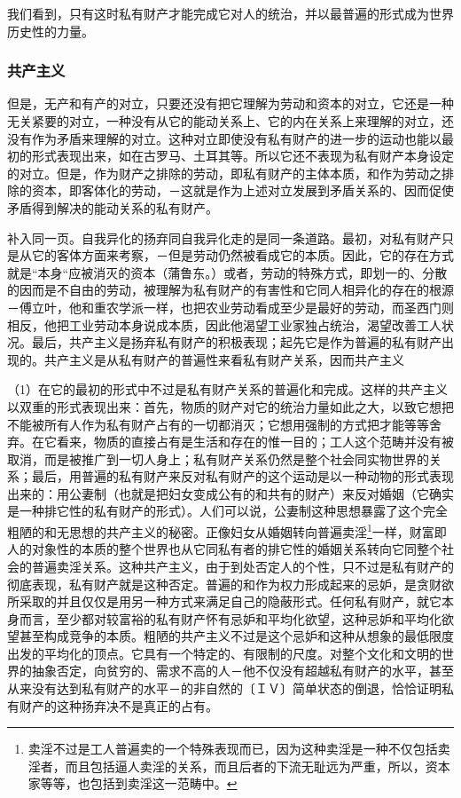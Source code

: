 \documentclass[a4paper,twoside,12pt]{ctexart}
\begin{document}
我们看到，只有这时私有财产才能完成它对人的统治，并以最普遍的形式成为世界历史性的力量。

\subsubsection{共产主义}
但是，无产和有产的对立，只要还没有把它理解为劳动和资本的对立，它还是一种无关紧要的对立，一种没有从它的能动关系上、它的内在关系上来理解的对立，还没有作为矛盾来理解的对立。这种对立即使没有私有财产的进一步的运动也能以最初的形式表现出来，如在古罗马、土耳其等。所以它还不表现为私有财产本身设定的对立。但是，作为财产之排除的劳动，即私有财产的主体本质，和作为劳动之排除的资本，即客体化的劳动，－这就是作为上述对立发展到矛盾关系的、因而促使矛盾得到解决的能动关系的私有财产。

补入同一页。自我异化的扬弃同自我异化走的是同一条道路。最初，对私有财产只是从它的客体方面来考察，－但是劳动仍然被看成它的本质。因此，它的存在方式就是“本身“应被消灭的资本（蒲鲁东。）或者，劳动的特殊方式，即划一的、分散的因而是不自由的劳动，被理解为私有财产的有害性和它同人相异化的存在的根源－傅立叶，他和重农学派一样，也把农业劳动看成至少是最好的劳动，而圣西门则相反，他把工业劳动本身说成本质，因此他渴望工业家独占统治，渴望改善工人状况。最后，共产主义是扬弃私有财产的积极表现；起先它是作为普遍的私有财产出现的。共产主义是从私有财产的普遍性来看私有财产关系，因而共产主义

（1）在它的最初的形式中不过是私有财产关系的普遍化和完成。这样的共产主义以双重的形式表现出来：首先，物质的财产对它的统治力量如此之大，以致它想把不能被所有人作为私有财产占有的一切都消灭；它想用强制的方式把才能等等舍弃。在它看来，物质的直接占有是生活和存在的惟一目的；工人这个范畴并没有被取消，而是被推广到一切人身上；私有财产关系仍然是整个社会同实物世界的关系；最后，用普遍的私有财产来反对私有财产的这个运动是以一种动物的形式表现出来的：用公妻制（也就是把妇女变成公有的和共有的财产）来反对婚姻（它确实是一种排它性的私有财产的形式）。人们可以说，公妻制这种思想暴露了这个完全粗陋的和无思想的共产主义的秘密。正像妇女从婚姻转向普遍卖淫\footnote{卖淫不过是工人普遍卖的一个特殊表现而已，因为这种卖淫是一种不仅包括卖淫者，而且包括逼人卖淫的关系，而且后者的下流无耻远为严重，所以，资本家等等，也包括到卖淫这一范畴中。}一样，财富即人的对象性的本质的整个世界也从它同私有者的排它性的婚姻关系转向它同整个社会的普遍卖淫关系。这种共产主义，由于到处否定人的个性，只不过是私有财产的彻底表现，私有财产就是这种否定。普遍的和作为权力形成起来的忌妒，是贪财欲所采取的并且仅仅是用另一种方式来满足自己的隐蔽形式。任何私有财产，就它本身而言，至少都对较富裕的私有财产怀有忌妒和平均化欲望，这种忌妒和平均化欲望甚至构成竞争的本质。粗陋的共产主义不过是这个忌妒和这种从想象的最低限度出发的平均化的顶点。它具有一个特定的、有限制的尺度。对整个文化和文明的世界的抽象否定，向贫穷的、需求不高的人－他不仅没有超越私有财产的水平，甚至从来没有达到私有财产的水平－的非自然的〔ＩＶ〕简单状态的倒退，恰恰证明私有财产的这种扬弃决不是真正的占有。
\end{document}
